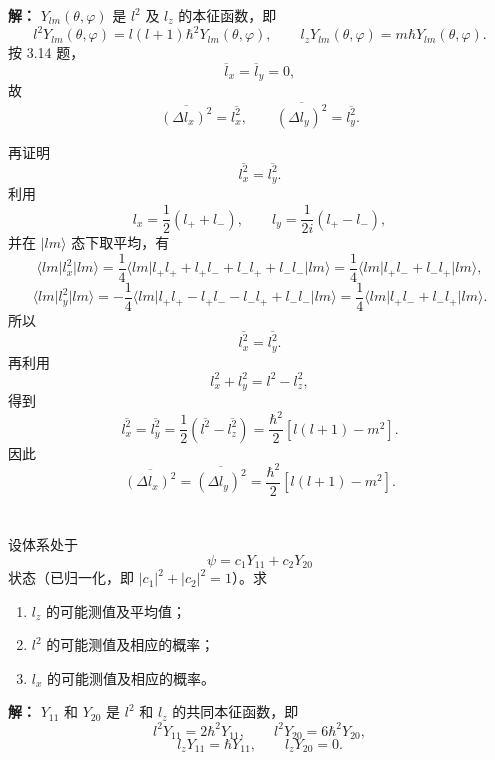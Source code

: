 \documentclass[12pt,a4paper]{article}
\begin{document}
\vspace{0.5cm}

\noindent\textbf{解：}
\(Y_{lm}(\theta,\varphi)\) 是 \(l^{2}\) 及 \(l_{z}\) 的本征函数，即
\[
l^{2}Y_{lm}(\theta,\varphi)=l(l+1)\hbar^{2}Y_{lm}(\theta,\varphi),
\qquad
l_{z}Y_{lm}(\theta,\varphi)=m\hbar Y_{lm}(\theta,\varphi).
\]
按 3.14 题，
\[
\overline{l}_{x}=\overline{l}_{y}=0,
\]
故
\[
\overline{(\Delta l_{x})^{2}}=\overline{l_{x}^{2}},
\qquad
\overline{(\Delta l_{y})^{2}}=\overline{l_{y}^{2}}.
\]

再证明
\[
\overline{l_{x}^{2}}=\overline{l_{y}^{2}}.
\]
利用
\[
l_{x}=\frac{1}{2}(l_{+}+l_{-}),
\qquad
l_{y}=\frac{1}{2i}(l_{+}-l_{-}),
\]
并在 \(\lvert lm\rangle\) 态下取平均，有
\[
\langle l m\lvert l _{x}^{2}\rvert l m\rangle
=
\frac{1}{4}
\langle l m\lvert
l_{+}l_{+}+l_{+}l_{-}+l_{-}l_{+}+l_{-}l_{-}
\rvert l m\rangle
=
\frac{1}{4}\langle l m\lvert l _{+}l_{-}+l_{-}l_{+}\rvert l m\rangle,
\]
\[
\langle l m\lvert l _{y}^{2}\rvert l m\rangle
=
-\frac{1}{4}
\langle l m\lvert
l_{+}l_{+}-l_{+}l_{-}-l_{-}l_{+}+l_{-}l_{-}
\rvert l m\rangle
=
\frac{1}{4}\langle l m\lvert l _{+}l_{-}+l_{-}l_{+}\rvert l m\rangle.
\]
所以
\[
\overline{l_{x}^{2}}=\overline{l_{y}^{2}}.
\]
再利用
\[
l_{x}^{2}+l_{y}^{2}=l^{2}-l_{z}^{2},
\]
得到
\[
\overline{l_{x}^{2}}=\overline{l_{y}^{2}}
=
\frac{1}{2}\left(\overline{l^{2}}-\overline{l_{z}^{2}}\right)
=
\frac{\hbar^{2}}{2}\left[l(l+1)-m^{2}\right].
\]
因此
\[
\overline{(\Delta l _{x})^{2}}
=
\overline{(\Delta l _{y})^{2}}
=
\frac{\hbar^{2}}{2}\left[l(l+1)-m^{2}\right].
\]

\section{}
设体系处于
\[
\psi=c_{1}Y_{11}+c_{2}Y_{20}
\]
状态（已归一化，即 \(|c_{1}|^{2}+|c_{2}|^{2}=1\)）。求

\begin{enumerate}[label=(\alph*)]
    \item \(l_{z}\) 的可能测值及平均值；
    \item \(l^{2}\) 的可能测值及相应的概率；
    \item \(l_{x}\) 的可能测值及相应的概率。
\end{enumerate}

\vspace{0.5cm}

\noindent\textbf{解：}
\(Y_{11}\) 和 \(Y_{20}\) 是 \(l^{2}\) 和 \(l_{z}\) 的共同本征函数，即
\[
l^{2}Y_{11}=2\hbar^{2}Y_{11},\qquad
l^{2}Y_{20}=6\hbar^{2}Y_{20},
\]
\[
l_{z}Y_{11}=\hbar Y_{11},\qquad
l_{z}Y_{20}=0.
\]
\end{document}
